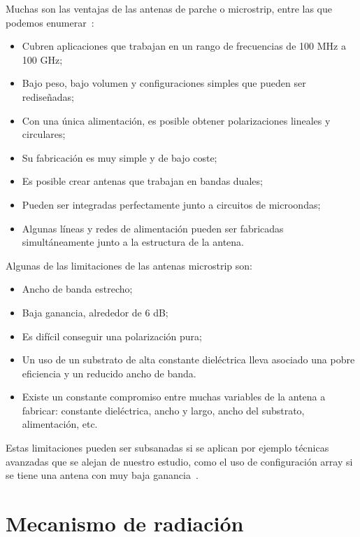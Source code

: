 Muchas son las ventajas de las antenas de parche o microstrip, entre las que podemos enumerar~\cite{garg}:
\begin{itemize}
    \item Cubren aplicaciones que trabajan en un rango de frecuencias de 100 MHz a 100 GHz;
    \item Bajo peso, bajo volumen y configuraciones simples que pueden ser rediseñadas;
    \item Con una única alimentación, es posible obtener polarizaciones lineales y circulares;
    \item Su fabricación es muy simple y de bajo coste;
    \item Es posible crear antenas que trabajan en bandas duales;
    \item Pueden ser integradas perfectamente junto a circuitos de microondas;
    \item Algunas líneas y redes de alimentación pueden ser fabricadas simultáneamente junto a la estructura de la antena.
\end{itemize}

\begin{flushleft}
    Algunas de las limitaciones de las antenas microstrip son:
\end{flushleft}
\begin{itemize}
    \item Ancho de banda estrecho;
    \item Baja ganancia, alrededor de 6 dB;
    \item Es difícil conseguir una polarización pura;
    \item Un uso de un substrato de alta constante dieléctrica lleva asociado una pobre eficiencia y un reducido ancho de banda.
    \item Existe un constante compromiso entre muchas variables de la antena a fabricar: constante dieléctrica, ancho y largo, ancho del substrato, alimentación, etc.
\end{itemize}

Estas limitaciones pueden ser subsanadas si se aplican por ejemplo técnicas avanzadas que se alejan de nuestro estudio, como el uso de configuración array si se tiene una antena con muy baja ganancia~\cite{garg9}.


\section{Mecanismo de radiación}\label{sec:mecanismo}

